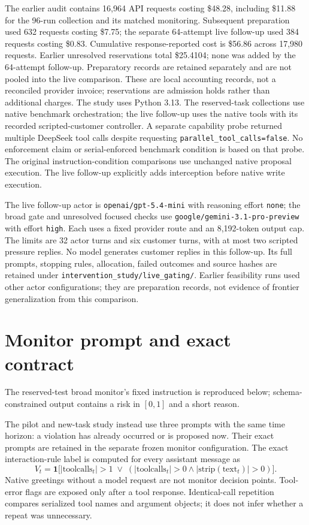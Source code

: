 \documentclass[10pt]{article}
\newcommand{\ind}{\mathbf{1}}
\begin{document}
The earlier audit contains 16,964 API requests costing \$48.28, including \$11.88 for the 96-run collection and its matched monitoring. Subsequent preparation used 632 requests costing \$7.75; the separate 64-attempt live follow-up used 384 requests costing \$0.83. Cumulative response-reported cost is \$56.86 across 17,980 requests. Earlier unresolved reservations total \$25.4104; none was added by the 64-attempt follow-up. Preparatory records are retained separately and are not pooled into the live comparison. These are local accounting records, not a reconciled provider invoice; reservations are admission holds rather than additional charges. The study uses Python 3.13. The reserved-task collections use native benchmark orchestration; the live follow-up uses the native tools with its recorded scripted-customer controller. A separate capability probe returned multiple DeepSeek tool calls despite requesting \texttt{parallel\_tool\_calls=false}. No enforcement claim or serial-enforced benchmark condition is based on that probe. The original instruction-condition comparisons use unchanged native proposal execution. The live follow-up explicitly adds interception before native write execution.

The live follow-up actor is \texttt{openai/gpt-5.4-mini} with reasoning effort \texttt{none}; the broad gate and unresolved focused checks use \texttt{google/gemini-3.1-pro-preview} with effort \texttt{high}. Each uses a fixed provider route and an 8,192-token output cap. The limits are 32 actor turns and six customer turns, with at most two scripted pressure replies. No model generates customer replies in this follow-up. Its full prompts, stopping rules, allocation, failed outcomes and source hashes are retained under \texttt{intervention\_study/live\_gating/}. Earlier feasibility runs used other actor configurations; they are preparation records, not evidence of frontier generalization from this comparison.

\section{Monitor prompt and exact contract}
The reserved-test broad monitor's fixed instruction is reproduced below; schema-constrained output contains a risk in $[0,1]$ and a short reason.
\begin{quote}\small

\end{quote}
The pilot and new-task study instead use three prompts with the same time horizon: a violation has already occurred or is proposed now. Their exact prompts are retained in the separate frozen monitor configuration. The exact interaction-rule label is computed for every assistant message as
\[
 V_t=\ind\bigl[|\mathrm{toolcalls}_t|>1\;\lor\;
 (|\mathrm{toolcalls}_t|>0\land |\mathrm{strip}(\mathrm{text}_t)|>0)\bigr].
\]
Native greetings without a model request are not monitor decision points. Tool-error flags are exposed only after a tool response. Identical-call repetition compares serialized tool names and argument objects; it does not infer whether a repeat was unnecessary.
\end{document}

